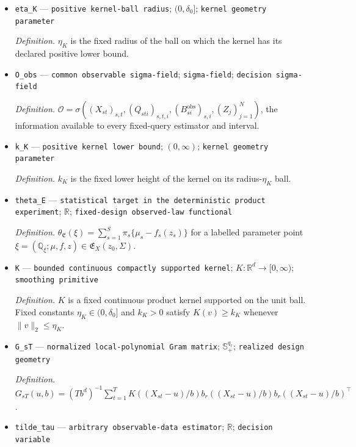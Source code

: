 \documentclass{article}
\begin{document}
\begin{itemize}
  \item \texttt{eta\_\allowbreak{}K} --- \texttt{positive kernel-\allowbreak{}ball radius}; \((0,\delta_0]\); \texttt{kernel geometry parameter}
  \par\smallskip\noindent\emph{Definition.} \(\eta_K\) is the fixed radius of the ball on which the kernel has its declared positive lower bound.
  \item \texttt{O\_\allowbreak{}obs} --- \texttt{common observable sigma-\allowbreak{}field}; \texttt{sigma-\allowbreak{}field}; \texttt{decision sigma-\allowbreak{}field}
  \par\smallskip\noindent\emph{Definition.} \(\mathcal O=\sigma((X_{st})_{s,t},(Q_{sti})_{s,t,i},(B_{si}^{\mathrm{obs}})_{s,i},(Z_j)_{j=1}^{N})\), the information available to every fixed-query estimator and interval.
  \item \texttt{k\_\allowbreak{}K} --- \texttt{positive kernel lower bound}; \((0,\infty)\); \texttt{kernel geometry parameter}
  \par\smallskip\noindent\emph{Definition.} \(k_K\) is the fixed lower height of the kernel on its radius-\(\eta_K\) ball.
  \item \texttt{theta\_\allowbreak{}E} --- \texttt{statistical target in the deterministic product experiment}; \(\mathbb R\); \texttt{fixed-\allowbreak{}design observed-\allowbreak{}law functional}
  \par\smallskip\noindent\emph{Definition.} \(\theta_{\mathfrak E}(\xi)=\sum_{s=1}^{S}\pi_s\{\mu_s-f_s(z_s)\}\) for a labelled parameter point \(\xi=(\mathbb Q_\xi;\mu,f,z)\in\mathfrak E_X(z_0,\Sigma)\).
  \item \texttt{K} --- \texttt{bounded continuous compactly supported kernel}; \(K:\mathbb R^d\to[0,\infty)\); \texttt{smoothing primitive}
  \par\smallskip\noindent\emph{Definition.} \(K\) is a fixed continuous product kernel supported on the unit ball. Fixed constants \(\eta_K\in(0,\delta_0]\) and \(k_K>0\) satisfy \(K(v)\ge k_K\) whenever \(\|v\|_2\le\eta_K\).
  \item \texttt{G\_\allowbreak{}sT} --- \texttt{normalized local-\allowbreak{}polynomial Gram matrix}; \(\mathbb S_+^{q_r}\); \texttt{realized design geometry}
  \par\smallskip\noindent\emph{Definition.} \(G_{sT}(u,b)=(Tb^d)^{-1}\sum_{t=1}^{T}K((X_{st}-u)/b)b_r((X_{st}-u)/b)b_r((X_{st}-u)/b)^{\top}\).
  \item \texttt{tilde\_\allowbreak{}tau} --- \texttt{arbitrary observable-\allowbreak{}data estimator}; \(\mathbb R\); \texttt{decision variable}

\end{itemize}
\end{document}

